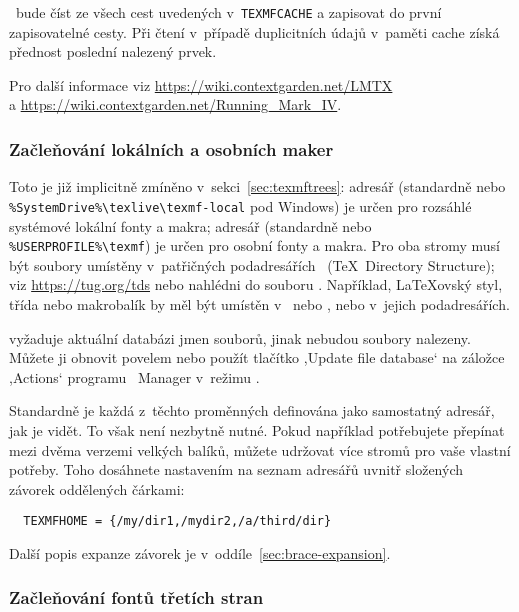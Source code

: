 \documentclass[\classoptions,slovak,english,czech]{\classname}
\newcommand{\singleuv}[1]{,#1`}
\begin{document}
\ConTeXt\ bude číst ze všech cest uvedených 
v~\verb+TEXMFCACHE+ a zapisovat do první zapisovatelné cesty. 
Při čtení v~případě duplicitních údajů v~paměti cache získá
přednost poslední nalezený prvek.

Pro další informace viz \url{https://wiki.contextgarden.net/LMTX}\\
a \url{https://wiki.contextgarden.net/Running_Mark_IV}.

\subsubsection{Začleňování lokálních a osobních maker}
\label{sec:local_personal_macros}

Toto je již implicitně zmíněno v~sekci~\ref{sec:texmftrees}:
adresář  (standardně 
 nebo
\verb|%SystemDrive%\texlive\texmf-local| pod Windows)
je určen pro rozsáhlé systémové %
lokální fonty a makra; adresář
 (standardně  nebo
\verb|%USERPROFILE%\texmf|) je určen pro osobní fonty a makra.
Pro oba stromy musí být soubory umístěny v~patřičných 
podadresářích \TDS\ (\TeX\ Directory Structure);
viz \url{https://tug.org/tds} nebo nahlédni do souboru
. Například, \LaTeX{}ovský 
styl, třída nebo makrobalík by měl být umístěn
v~ nebo
, nebo v~jejich podadresářích.

 vyžaduje aktuální databázi jmen souborů, jinak
nebudou soubory nalezeny.
Můžete ji obnovit povelem  nebo použít tlačítko
\singleuv{Update file database} na záložce \singleuv{Actions} programu
\TL\ Manager v~režimu \GUI.

Standardně je každá z~těchto proměnných definována jako 
samostatný adresář, jak je vidět. To však není nezbytně nutné. 
Pokud například potřebujete přepínat mezi dvěma verzemi velkých
balíků, můžete udržovat více stromů pro vaše vlastní potřeby.  
Toho dosáhnete nastavením  na seznam adresářů uvnitř 
složených závorek oddělených čárkami:

\begin{verbatim}
  TEXMFHOME = {/my/dir1,/mydir2,/a/third/dir}
\end{verbatim}

Další popis expanze závorek je v~oddíle~\ref{sec:brace-expansion}.

\subsubsection{Začleňování fontů třetích stran}
\end{document}
